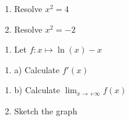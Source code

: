 \documentclass{article}
\begin{document}
1.  Resolve $x^2=4$


2.  Resolve $x^2=-2$







1.  Let $f: x \mapsto \ln(x)-x$




1. a)  Calculate $f'(x)$


1. b)  Calculate $\displaystyle\lim_{x\to +\infty}f(x)$




2.  Sketch the graph
\end{document}
